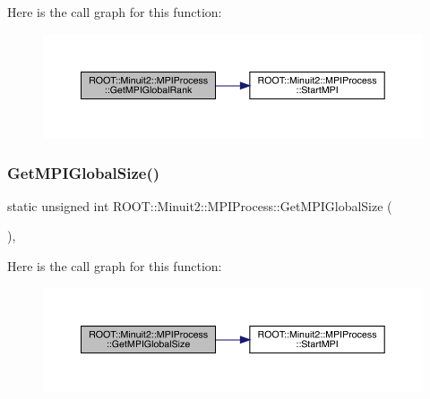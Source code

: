 Here is the call graph for this function\+:
\nopagebreak
\begin{figure}[H]
\begin{center}
\leavevmode
\includegraphics[width=350pt]{dc/d43/classROOT_1_1Minuit2_1_1MPIProcess_aa7c524a7980698bf9bba3a652e2f9a13_cgraph}
\end{center}
\end{figure}
\mbox{\label{classROOT_1_1Minuit2_1_1MPIProcess_acfa3106122ad8f8c7d6bb3777c3d1ccc}} 
\subsubsection{\texorpdfstring{GetMPIGlobalSize()}{GetMPIGlobalSize()}\hspace{0.1cm}{\footnotesize\ttfamily [1/3]}}
{\footnotesize\ttfamily static unsigned int R\+O\+O\+T\+::\+Minuit2\+::\+M\+P\+I\+Process\+::\+Get\+M\+P\+I\+Global\+Size (\begin{DoxyParamCaption}{ }\end{DoxyParamCaption})\hspace{0.3cm}{\ttfamily [inline]}, {\ttfamily [static]}}

Here is the call graph for this function\+:
\nopagebreak
\begin{figure}[H]
\begin{center}
\leavevmode
\includegraphics[width=350pt]{dc/d43/classROOT_1_1Minuit2_1_1MPIProcess_acfa3106122ad8f8c7d6bb3777c3d1ccc_cgraph}
\end{center}
\end{figure}
\mbox{\label{classROOT_1_1Minuit2_1_1MPIProcess_acfa3106122ad8f8c7d6bb3777c3d1ccc}} 
